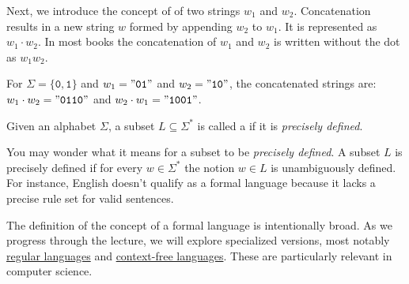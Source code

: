 Next, we introduce the concept of   of two strings \( w_1 \) and
\(w_2 \). Concatenation results in a new string \( w \) formed by appending \( w_2 \) to \( w_1 \). It is
represented as \( w_1 \cdot w_2 \).  In most books the concatenation of $w_1$ and $w_2$ is written without the
dot as \( w_1w_2 \). 

\vspace*{0.3cm}

\exampleEng
For \( \Sigma = \{\mathtt{0}, \mathtt{1}\} \) and \( w_1 = \mathtt{"01"} \) and \( w_2 = \mathtt{"10"} \), the concatenated strings are:
\\[0.2cm]
\hspace*{1.3cm}
\( w_1 \cdot w_2 = \mathtt{"0110"} \) and \( w_2 \cdot w_1 = \mathtt{"1001"} \). \eox

\begin{Definition} \hspace*{\fill} \linebreak
Given an alphabet \( \Sigma \), a subset \( L \subseteq \Sigma^* \) is called a  if it is
\emph{precisely defined}.  \eox 
\end{Definition}

You may wonder what it means for a subset to be \emph{precisely defined}.  A subset $L$ is precisely defined if
for every $w \in \Sigma^*$ the notion $w \in L$ is unambiguously defined.  For instance, English doesn't
qualify as a formal language because it lacks a precise rule set for valid sentences. 
\vspace*{0.2cm}

The  definition of the concept of a formal language is intentionally broad. As we progress through the lecture,
we will explore specialized 
versions, most notably \href{http://en.wikipedia.org/wiki/Regular_language}{regular languages}
 and \href{http://en.wikipedia.org/wiki/Context-free_language}{context-free
  languages}.  These are particularly relevant in computer science. 


